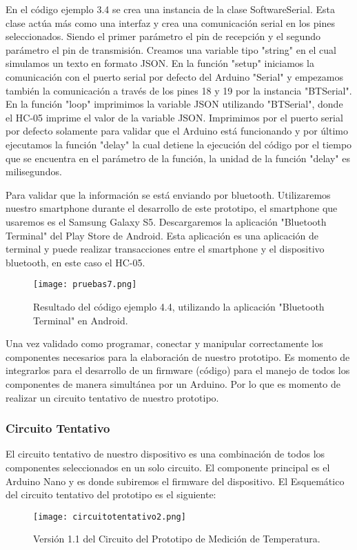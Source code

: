 \par \noindent
En el código ejemplo 3.4 se crea una instancia de la clase SoftwareSerial. Esta clase actúa más como una interfaz y crea una comunicación serial en los pines seleccionados. Siendo el primer parámetro el pin de recepción y el segundo parámetro el pin de transmisión. Creamos una variable tipo "string" en el cual simulamos un texto en formato JSON. En la función "setup" iniciamos la comunicación con el puerto serial por defecto del Arduino "Serial" y empezamos también la comunicación a través de los pines 18 y 19 por la instancia "BTSerial". En la función "loop" imprimimos la variable JSON utilizando "BTSerial", donde el HC-05 imprime el valor de la variable JSON. Imprimimos por el puerto serial por defecto solamente para validar que el Arduino está funcionando y por último ejecutamos la función "delay" la cual detiene la ejecución del código por el tiempo que se encuentra en el parámetro de la función, la unidad de la función "delay" es milisegundos. 

\par \noindent
Para validar que la información se está enviando por bluetooth. Utilizaremos nuestro smartphone durante el desarrollo de este prototipo, el smartphone que usaremos es el Samsung Galaxy S5. Descargaremos la aplicación "Bluetooth Terminal"\cite{btterminal} del Play Store de Android. Esta aplicación es una aplicación de terminal y puede realizar transacciones entre el smartphone y el dispositivo bluetooth\cite{btterminal}, en este caso el HC-05.


\begin{figure}[H]
	\centering
	\texttt{[image: pruebas7.png]}
	\caption{Resultado del código ejemplo 4.4, utilizando la aplicación "Bluetooth Terminal" en Android.}
\end{figure}

\par \noindent
Una vez validado como programar, conectar y manipular correctamente los componentes necesarios para la elaboración de nuestro prototipo. Es momento de integrarlos para el desarrollo de un firmware (código) para el manejo de todos los componentes de manera simultánea por un Arduino. Por lo que es momento de realizar un circuito tentativo de nuestro prototipo.

\subsubsection{Circuito Tentativo}
\par 
El circuito tentativo de nuestro dispositivo es una combinación de todos los componentes seleccionados en un solo circuito. El componente principal es el Arduino Nano y es donde subiremos el firmware del dispositivo. El Esquemático del circuito tentativo del prototipo es el siguiente:

\begin{figure}[H]
	\centering
	\texttt{[image: circuitotentativo2.png]}
	\caption{Versión 1.1 del Circuito del Prototipo de Medición de Temperatura.}
\end{figure}
